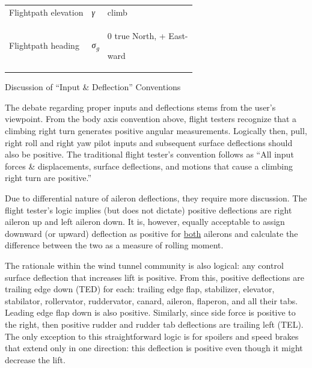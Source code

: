 \documentclass[
]{book}
\begin{document}
\begin{longtable}[]{@{}lll@{}}
\begin{minipage}[t]{0.56\columnwidth}
Flightpath elevation\strut
\end{minipage} & \begin{minipage}[t]{0.12\columnwidth}\raggedright
\emph{γ}\strut
\end{minipage} & \begin{minipage}[t]{0.23\columnwidth}\raggedright
climb\strut
\end{minipage}\tabularnewline
\begin{minipage}[t]{0.56\columnwidth}\raggedright
Flightpath heading\strut
\end{minipage} & \begin{minipage}[t]{0.12\columnwidth}\raggedright
\emph{σ\textsubscript{g}}\strut
\end{minipage} & \begin{minipage}[t]{0.23\columnwidth}\raggedright
0 true North, + East-

ward\strut
\end{minipage}\tabularnewline
\bottomrule
\end{longtable}

Discussion of ``Input \& Deflection'' Conventions

The debate regarding proper inputs and deflections stems from the user's viewpoint. From the body axis convention above, flight testers recognize that a climbing right turn generates positive angular measurements. Logically then, pull, right roll and right yaw pilot inputs and subsequent surface deflections should also be positive. The traditional flight tester's convention follows as ``All input forces \& displacements, surface deflections, and motions that cause a climbing right turn are positive.''

Due to differential nature of aileron deflections, they require more discussion. The flight tester's logic implies (but does not dictate) positive deflections are right aileron up and left aileron down. It is, however, equally acceptable to assign downward (or upward) deflection as positive for \underline{both} ailerons and calculate the difference between the two as a measure of rolling moment.

The rationale within the wind tunnel community is also logical: any control surface deflection that increases lift is positive. From this, positive deflections are trailing edge down (TED) for each: trailing edge flap, stabilizer, elevator, stabilator, rollervator, ruddervator, canard, aileron, flaperon, and all their tabs. Leading edge flap down is also positive. Similarly, since side force is positive to the right, then positive rudder and rudder tab deflections are trailing left (TEL). The only exception to this straightforward logic is for spoilers and speed brakes that extend only in one direction: this deflection is positive even though it might decrease the lift.
\end{document}
